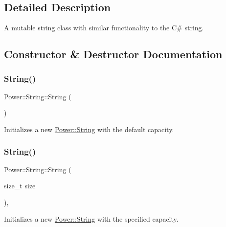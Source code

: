 \subsection{Detailed Description}
A mutable string class with similar functionality to the C\# string. 

\subsection{Constructor \& Destructor Documentation}
\mbox{\label{class_power_1_1_string_a3ae78cdde9e4e81b420277b5581fee8a}} 
\subsubsection{\texorpdfstring{String()}{String()}\hspace{0.1cm}{\footnotesize\ttfamily [1/7]}}
{\footnotesize\ttfamily Power\+::\+String\+::\+String (\begin{DoxyParamCaption}{ }\end{DoxyParamCaption})\hspace{0.3cm}{\ttfamily [inline]}}



Initializes a new \hyperlink{class_power_1_1_string}{Power\+::\+String} with the default capacity. 

\mbox{\label{class_power_1_1_string_a9384235fbbc6956c166abb265e60db11}} 
\subsubsection{\texorpdfstring{String()}{String()}\hspace{0.1cm}{\footnotesize\ttfamily [2/7]}}
{\footnotesize\ttfamily Power\+::\+String\+::\+String (\begin{DoxyParamCaption}\item[{size\+\_\+t}]{size }\end{DoxyParamCaption})\hspace{0.3cm}{\ttfamily [inline]}, {\ttfamily [explicit]}}



Initializes a new \hyperlink{class_power_1_1_string}{Power\+::\+String} with the specified capacity. 


